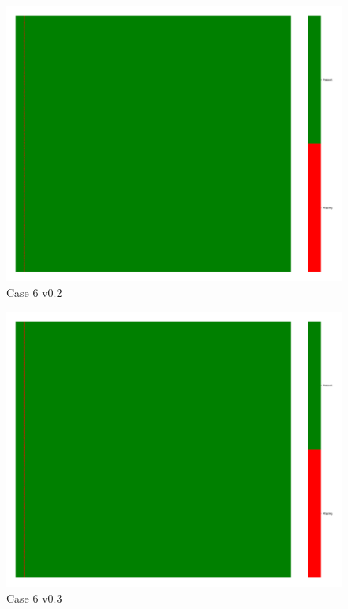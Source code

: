 \documentclass[a4paper,12pt]{article}
\begin{document}
\begin{figure}[H]
    \includegraphics[width=\linewidth]{case6_v0.2_heatmap_cleaned.png}
    \caption*{Case 6 v0.2}
\end{figure}

\begin{figure}[H]
    \includegraphics[width=\linewidth]{case6_v0.3_heatmap_cleaned.png}
    \caption*{Case 6 v0.3}
\end{figure}
\end{document}
